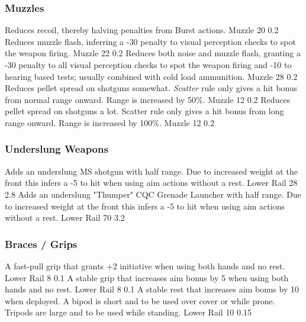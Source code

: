 \subsubsection{Muzzles}
\vspace{8mm}
\begin{multicols}{2}
    {Reduces recoil, thereby halving penalties from Burst actions.}
    {Muzzle}
    {20}
    {0.2}
    {Reduces muzzle flash,
        inferring a -30 penalty to visual perception checks to spot the weapon firing.}
    {Muzzle}
    {22}
    {0.2}
    {Reduces both noise and muzzle flash,
        granting a -30 penalty to all visual perception checks to spot the weapon firing
        and -10 to hearing based tests;
        usually combined with cold load ammunition.}
    {Muzzle}
    {28}
    {0.2}
    {Reduces pellet spread on shotguns somewhat.
        \emph{Scatter} rule only gives a hit bonus from normal range onward.
        Range is increased by 50\%.}
    {Muzzle}
    {12}
    {0.2}
    {Reduces pellet spread on shotguns a lot.
        Scatter rule only gives a hit bonus from long range onward.
        Range is increased by 100\%.}
    {Muzzle}
    {12}
    {0.2}
\end{multicols}

\subsubsection{Underslung Weapons}
\vspace{8mm}
\begin{multicols}{2}
    {Adds an underslung MS shotgun with half range.
        Due to increased weight at the front this infers a -5 to hit when using aim actions without a rest.}
    {Lower Rail}
    {28}
    {2.8}
    {Adds an underslung "Thumper" CQC Grenade Launcher with half range.
        Due to increased weight at the front this infers a -5 to hit when using aim actions without a rest.}
    {Lower Rail}
    {70}
    {3.2}
\end{multicols}

\subsubsection{Braces / Grips}
\vspace{8mm}
\begin{multicols}{2}
    {A fast-pull grip that grants +2 initiative when using both hands and no rest.}
    {Lower Rail}
    {8}
    {0.1}
    {A stable grip that increases aim bonus by 5 when using both hands and no rest.}
    {Lower Rail}
    {8}
    {0.1}
    {A stable rest that increases aim bonus by 10 when deployed.
        A bipod is short and to be used over cover or while prone.
        Tripods are large and to be used while standing.}
    {Lower Rail}
    {10}
    {0.15}
\end{multicols}

